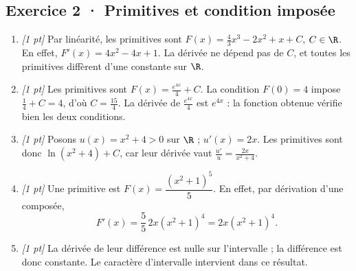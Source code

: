 \subsection*{Exercice 2 · Primitives et condition imposée}\begin{enumerate}

\item \textit{[1 pt]} Par linéarité, les primitives sont $F(x)=\frac{4}{3}x^3-2x^2+x+C$, $C\in\R$. En effet, $F'(x)=4x^2-4x+1$. La dérivée ne dépend pas de $C$, et toutes les primitives diffèrent d'une constante sur $\R$.

\item \textit{[1 pt]} Les primitives sont $F(x)=\frac{e^{4x}}{4}+C$. La condition $F(0)=4$ impose $\frac{1}{4}+C=4$, d'où $C=\frac{15}{4}$. La dérivée de $\frac{e^{4x}}{4}$ est $e^{4x}$ : la fonction obtenue vérifie bien les deux conditions.

\item \textit{[1 pt]} Posons $u(x)=x^2+4>0$ sur $\R$ ; $u'(x)=2x$. Les primitives sont donc $\ln(x^2+4)+C$, car leur dérivée vaut $\frac{u'}{u}=\frac{2x}{x^2+4}$.

\item \textit{[1 pt]} Une primitive est $F(x)=\dfrac{(x^2+1)^{5}}{5}$. En effet, par dérivation d'une composée,
\[F'(x)=\frac{5}{5}\,2x(x^2+1)^{4}=2x(x^2+1)^{4}.\]

\item \textit{[1 pt]} La dérivée de leur différence est nulle sur l'intervalle ; la différence est donc constante. Le caractère d'intervalle intervient dans ce résultat.

\end{enumerate}

